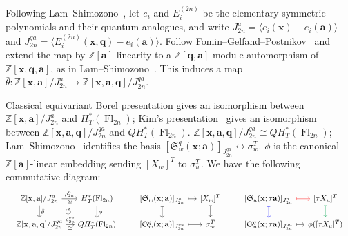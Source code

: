 \documentclass[12pt]{amsart}
\theoremstyle{definition}
\theoremstyle{remark}
\DeclareMathOperator{\Fl}{Fl}
\begin{document}
Following Lam--Shimozono~\cite[Section~2.1]{lam-shimozono},
let \(e_i\) and \(E_i^{(2n)}\) be the elementary symmetric polynomials
and their quantum analogues, and write
\(J_{2n}^{a}=\langle e_i(\mathbf{x})-e_i(\mathbf{a})\rangle\) and
\(J_{2n}^{qa}=\langle E_i^{(2n)}(\mathbf{x},\mathbf{q})-e_i(\mathbf{a})\rangle\).
Follow Fomin–Gelfand–Postnikov~\cite[Theorem~1.1, Proposition~3.3]{fomin-gelfand-postnikov} and extend the map by $\mathbb{Z}[\mathbf{a}]$-linearity to a $\mathbb{Z}[\mathbf{q}, \mathbf{a}]$-module automorphism of $\mathbb{Z}[\mathbf{x}, \mathbf{q}, \mathbf{a}]$, as in Lam--Shimozono~\cite[Section~3.3]{lam-shimozono}. This induces a map \(\bar{\theta} : \mathbb{Z}[\mathbf{x}, \mathbf{a}]/J_{2n}^a \to \mathbb{Z}[\mathbf{x}, \mathbf{a}, \mathbf{q}]/J_{2n}^{qa}\). 

Classical equivariant Borel presentation gives an isomorphism between \(\mathbb{Z}[\mathbf{x},\mathbf{a}]/J_{2n}^a\) and \(H^*_T(\Fl_{2n})\); Kim's presentation~\cite[Theorem~2]{kim-equivariant} gives an isomorphism between \(\mathbb{Z}[\mathbf{x},\mathbf{a},\mathbf{q}]/J_{2n}^{qa}\) and \(QH^*_T(\Fl_{2n})\).
\(\mathbb{Z}[\mathbf{x},\mathbf{a},\mathbf{q}]/J_{2n}^{qa}\cong QH_T^*(\Fl_{2n})\);
Lam--Shimozono~\cite[Theorem~5]{lam-shimozono} identifies the basis
\([\mathfrak{S}_w^q(\mathbf{x};\mathbf{a})]_{J_{2n}^{qa}}\longleftrightarrow\sigma_w^T\). $\phi$ is the canonical $\mathbb{Z}[\mathbf{a}]$-linear embedding sending $[X_w]^T$ to $\sigma_w^T$. We have the following commutative diagram:
\[
\resizebox{\linewidth}{!}{%
\begin{tikzcd}[column sep=1.1em, row sep=1.4em, ampersand replacement=\&]
	{\mathbb{Z}[\mathbf{x},\mathbf{a}]/J_{2n}^{a}}
		\& {H_T^*(\Fl_{2n})}
		\&\&
	{[\mathfrak{S}_w(\mathbf{x};\mathbf{a})]_{J_{2n}^{a}}}
		\& {[X_w]^T}
		\&\&
	{[\mathfrak{S}_u(\mathbf{x};\tau\mathbf{a})]_{J_{2n}^{a}}}
		\& {[\tau X_u]^T}
	\\
	{\mathbb{Z}[\mathbf{x},\mathbf{a},\mathbf{q}]/J_{2n}^{qa}}
		\& {QH_T^*(\Fl_{2n})}
		\&\&
	{[\mathfrak{S}_w^q(\mathbf{x};\mathbf{a})]_{J_{2n}^{qa}}}
		\& {\sigma_w^T}
		\&\&
	{[\mathfrak{S}_u^q(\mathbf{x};\tau\mathbf{a})]_{J_{2n}^{qa}}}
		\& {\phi([\tau X_u]^T)}
	\arrow["\rho_{2n}^{a}"{above}, "\cong"{below}, from=1-1, to=1-2]
	\arrow["{\bar\theta}"{right}, from=1-1, to=2-1]
	\arrow["\phi"{right}, from=1-2, to=2-2]
	\arrow[phantom, "\circlearrowleft", from=1-1, to=2-2]
	\arrow["\rho_{2n}^{qa}"{above}, "\cong"{below}, from=2-1, to=2-2]
	\arrow[maps to, from=1-4, to=1-5]
	\arrow[maps to, from=1-4, to=2-4]
	\arrow[maps to, from=1-5, to=2-5]
	\arrow[maps to, from=2-4, to=2-5]
	\arrow[maps to, red, from=1-7, to=1-8]
	\arrow[maps to, blue, from=1-7, to=2-7]
	\arrow[maps to, Green, from=1-8, to=2-8]
	\arrow[maps to, from=2-7, to=2-8]
\end{tikzcd}%
}
\]
\end{document}
